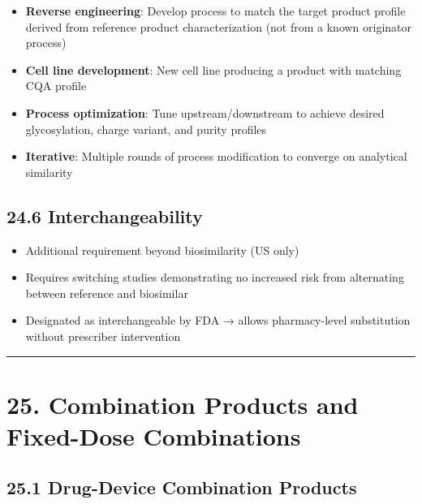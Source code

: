 \documentclass[
  11pt,
  a4paper,
]{report}
\providecommand{\tightlist}{%
  \setlength{\itemsep}{0pt}\setlength{\parskip}{0pt}}
\begin{document}
\begin{itemize}
\tightlist
\item
  \textbf{Reverse engineering}: Develop process to match the target
  product profile derived from reference product characterization (not
  from a known originator process)
\item
  \textbf{Cell line development}: New cell line producing a product with
  matching CQA profile
\item
  \textbf{Process optimization}: Tune upstream/downstream to achieve
  desired glycosylation, charge variant, and purity profiles
\item
  \textbf{Iterative}: Multiple rounds of process modification to
  converge on analytical similarity
\end{itemize}

\hypertarget{interchangeability}{%
\subsection{24.6 Interchangeability}\label{interchangeability}}

\begin{itemize}
\tightlist
\item
  Additional requirement beyond biosimilarity (US only)
\item
  Requires switching studies demonstrating no increased risk from
  alternating between reference and biosimilar
\item
  Designated as interchangeable by FDA → allows pharmacy-level
  substitution without prescriber intervention
\end{itemize}

\begin{center}\rule{0.5\linewidth}{0.5pt}\end{center}

\hypertarget{combination-products-and-fixed-dose-combinations}{%
\section{25. Combination Products and Fixed-Dose
Combinations}\label{combination-products-and-fixed-dose-combinations}}

\hypertarget{drug-device-combination-products}{%
\subsection{25.1 Drug-Device Combination
Products}\label{drug-device-combination-products}}
\end{document}
